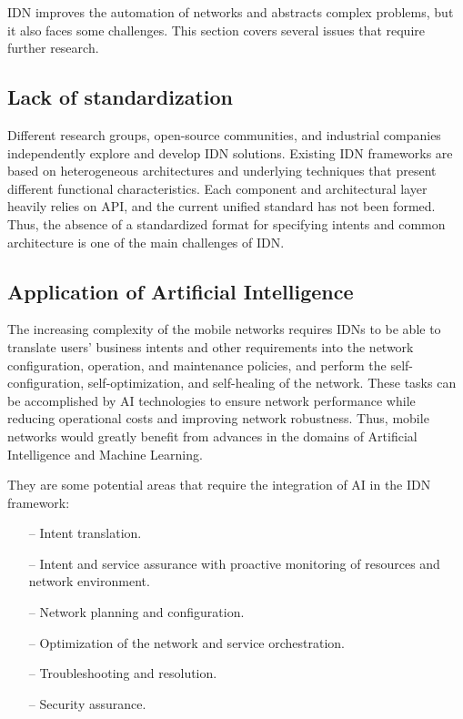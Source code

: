 IDN improves the automation of networks and abstracts complex problems, but it also faces some challenges. This section covers several issues that require further research.

\subsection{Lack of standardization}
Different research groups, open-source communities, and industrial companies independently explore and develop IDN solutions. Existing IDN frameworks are based on heterogeneous architectures and underlying techniques that present different functional characteristics. Each component and architectural layer heavily relies on API, and the current unified standard has not been formed. Thus, the absence of a standardized format for specifying intents and common architecture is one of the main challenges of IDN.\cite{8968429}

\subsection{Application of Artificial Intelligence}
The increasing complexity of the mobile networks requires IDNs to be able to translate users' business intents and other requirements into the network configuration, operation, and maintenance policies, and perform the self-configuration, self-optimization, and self-healing of the network. These tasks can be accomplished by AI technologies to ensure network performance while reducing operational costs and improving network robustness. Thus, mobile networks would greatly benefit from advances in the domains of Artificial Intelligence and Machine Learning.\cite{Wei2020}

They are some potential areas that require the integration of AI in the IDN framework:
\begin{itemize}
\item[--] Intent translation.
\item[--] Intent and service assurance with proactive monitoring of resources and network environment.
\item[--] Network planning and configuration.
\item[--] Optimization of the network and service orchestration.
\item[--] Troubleshooting and resolution.
\item[--] Security assurance.
\end{itemize}

